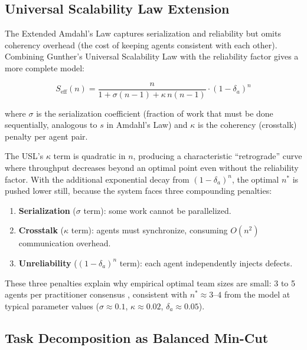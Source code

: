 \documentclass[11pt, a4paper]{googledeepmind}
\begin{document}
\subsection{Universal Scalability Law Extension}

The Extended Amdahl's Law captures serialization and reliability but omits coherency overhead (the cost of keeping agents consistent with each other). Combining Gunther's Universal Scalability Law \citep{gunther2008usl} with the reliability factor gives a more complete model:

\begin{equation}
\label{eq:usl-extended}
    S_{\mathrm{eff}}(n) = \frac{n}{1 + \sigma(n-1) + \kappa \, n(n-1)} \cdot (1-\delta_a)^n
\end{equation}

where $\sigma$ is the serialization coefficient (fraction of work that must be done sequentially, analogous to $s$ in Amdahl's Law) and $\kappa$ is the coherency (crosstalk) penalty per agent pair.

The USL's $\kappa$ term is quadratic in $n$, producing a characteristic ``retrograde'' curve where throughput decreases beyond an optimal point even without the reliability factor. With the additional exponential decay from $(1-\delta_a)^n$, the optimal $n^*$ is pushed lower still, because the system faces three compounding penalties:

\begin{enumerate}[nosep]
    \item \textbf{Serialization} ($\sigma$ term): some work cannot be parallelized.
    \item \textbf{Crosstalk} ($\kappa$ term): agents must synchronize, consuming $O(n^2)$ communication overhead.
    \item \textbf{Unreliability} ($(1-\delta_a)^n$ term): each agent independently injects defects.
\end{enumerate}

These three penalties explain why empirical optimal team sizes are small: 3 to 5 agents per practitioner consensus \citep{osmani2025}, consistent with $n^* \approx 3$--$4$ from the model at typical parameter values ($\sigma \approx 0.1$, $\kappa \approx 0.02$, $\delta_a \approx 0.05$).

\subsection{Task Decomposition as Balanced Min-Cut}
\end{document}
